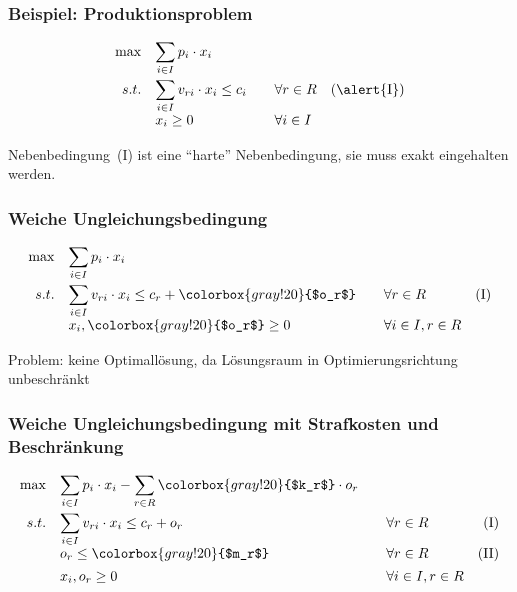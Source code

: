 \begin{frame}
 \frametitle{Beispiel: Produktionsproblem}
 \begin{equation*}
  \begin{array}{rllr}
    \max & \displaystyle\sum_{i\in I} p_i\cdot x_i & & \\[3ex]
    s.t. & \displaystyle\sum_{i\in I} v_{ri}\cdot x_i \leq c_i & \quad\forall r\in R & \mathrm{(\alert{I})}\\
	  & x_i \geq 0 & \quad\forall i\in I & \\
  \end{array}
 \end{equation*}
 
 Nebenbedingung~\textrm{(\alert{I})} ist eine "`harte"' Nebenbedingung, sie muss exakt eingehalten werden.
\end{frame}

\begin{frame}
 \frametitle{Weiche Ungleichungsbedingung}
 \begin{equation*}
  \begin{array}{rllr}
    \max & \displaystyle\sum_{i\in I} p_i\cdot x_i & & \\[3ex]
    s.t. & \displaystyle\sum_{i\in I} v_{ri}\cdot x_i \leq c_r + \colorbox{gray!20}{$o_r$} & \quad\forall r\in R & \mathrm{(I)}\\
	  & x_i, \colorbox{gray!20}{$o_r$} \geq 0 & \quad\forall i\in I, r\in R & \\
  \end{array}
 \end{equation*}
 
 Problem: keine Optimallösung, da Lösungsraum in Optimierungsrichtung unbeschränkt
\end{frame}

\begin{frame}
 \frametitle{Weiche Ungleichungsbedingung mit Strafkosten und Beschränkung}
 \begin{equation*}
  \begin{array}{rllr}
    \max & \displaystyle\sum_{i\in I} p_i\cdot x_i - \sum_{r\in R} \colorbox{gray!20}{$k_r$} \cdot o_r & & \\[3ex]
    s.t. & \displaystyle\sum_{i\in I} v_{ri}\cdot x_i \leq c_r + o_r & \quad\forall r\in R & \mathrm{(I)}\\
	& o_r \leq \colorbox{gray!20}{$m_r$} & \quad\forall r\in R & \mathrm{(II)}\\[1ex]
	& x_i,o_r \geq 0 & \quad\forall i\in I, r\in R & \\
  \end{array}
 \end{equation*}  
\end{frame}

